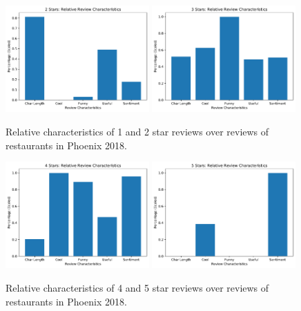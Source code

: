 \begin{figure}[h]
    \centering
    \includegraphics[width=0.49\textwidth]{img/phoenix2018/2Stars.pdf}
    \includegraphics[width=0.49\textwidth]{img/phoenix2018/3Stars.pdf}
    \caption{Relative characteristics of 1 and 2 star reviews over reviews of restaurants in Phoenix 2018.}
    \label{fig:23star}
\end{figure}

\begin{figure}[h]
    \centering
    \includegraphics[width=0.49\textwidth]{img/phoenix2018/4Stars.pdf}
    \includegraphics[width=0.49\textwidth]{img/phoenix2018/5Stars.pdf}
    \caption{Relative characteristics of 4 and 5 star reviews over reviews of restaurants in Phoenix 2018.}
    \label{fig:45star}
\end{figure}

